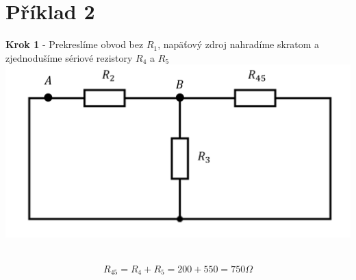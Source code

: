 \section{Příklad 2}

\begin{center}
    \textbf{Krok 1} - Prekreslíme obvod bez $R_{1}$, napäťový zdroj nahradíme skratom a zjednodušíme sériové rezistory $R_4$ a $R_5$ \\
    \includegraphics[scale=0.5,keepaspectratio]{fig/pr2_1.png} \
\end{center}

\begin{gather*}
    R_{45} = R_4 + R_5 = 200 + 550 = 750 \Omega \\
\end{gather*}

